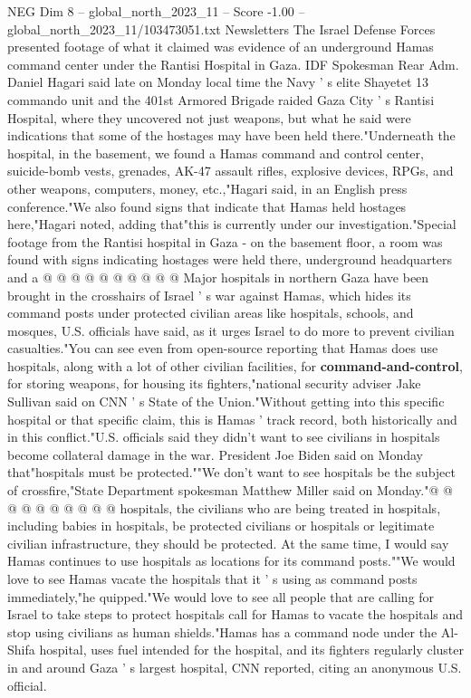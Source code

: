 \begin{textsample}{NEG Dim 8 – global\_north\_2023\_11 – Score -1.00 – global\_north\_2023\_11/103473051.txt}  \label{ex:f8_neg_333}
Newsletters The Israel Defense Forces presented footage of what it claimed was evidence of an underground Hamas command center under the Rantisi Hospital in Gaza.
IDF Spokesman Rear Adm.
Daniel Hagari said late on Monday local time the Navy ' s elite Shayetet 13 commando unit and the 401st Armored Brigade raided Gaza City ' s Rantisi Hospital, where they uncovered not just weapons, but what he said were indications that some of the hostages may have been held there."Underneath the hospital, in the basement, we found a Hamas command and control center, suicide-bomb vests, grenades, AK-47 assault rifles, explosive devices, RPGs, and other weapons, computers, money, etc.,"Hagari said, in an English press conference."We also found signs that indicate that Hamas held hostages here,"Hagari noted, adding that"this is currently under our investigation."Special footage from the Rantisi hospital in Gaza - on the basement floor, a room was found with signs indicating hostages were held there, underground headquarters and a @ @ @ @ @ @ @ @ @ @ Major hospitals in northern Gaza have been brought in the crosshairs of Israel ' s war against Hamas, which hides its command posts under protected civilian areas like hospitals, schools, and mosques, U.S. officials have said, as it urges Israel to do more to prevent civilian casualties."You can see even from open-source reporting that Hamas does use hospitals, along with a lot of other civilian facilities, for \textbf{command-and-control}, for storing weapons, for housing its fighters,"national security adviser Jake Sullivan said on CNN ' s State of the Union."Without getting into this specific hospital or that specific claim, this is Hamas ' track record, both historically and in this conflict."U.S. officials said they didn't want to see civilians in hospitals become collateral damage in the war.
President Joe Biden said on Monday that"hospitals must be protected.""We don't want to see hospitals be the subject of crossfire,"State Department spokesman Matthew Miller said on Monday."@ @ @ @ @ @ @ @ @ @ hospitals, the civilians who are being treated in hospitals, including babies in hospitals, be protected civilians or hospitals or legitimate civilian infrastructure, they should be protected.
At the same time, I would say Hamas continues to use hospitals as locations for its command posts.""We would love to see Hamas vacate the hospitals that it ' s using as command posts immediately,"he quipped."We would love to see all people that are calling for Israel to take steps to protect hospitals call for Hamas to vacate the hospitals and stop using civilians as human shields."Hamas has a command node under the Al-Shifa hospital, uses fuel intended for the hospital, and its fighters regularly cluster in and around Gaza ' s largest hospital, CNN reported, citing an anonymous U.S. official.

\end{textsample}
